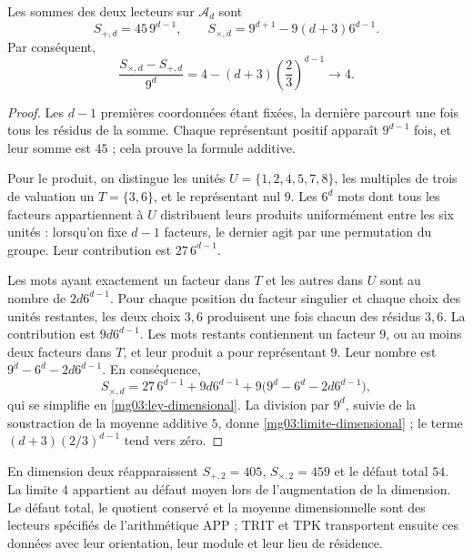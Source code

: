 \begin{proposition}
Les sommes des deux lecteurs sur \(\mathcal A_d\) sont
\begin{equation}
 S_{+,d}=45\,9^{d-1},\qquad
 S_{\times,d}=9^{d+1}-9(d+3)6^{d-1}.
 \label{mg03:ley-dimensional}
\end{equation}
Par conséquent,
\begin{equation}
 \frac{S_{\times,d}-S_{+,d}}{9^d}
 =4-(d+3)\left(\frac23\right)^{d-1}
 \longrightarrow4.
 \label{mg03:limite-dimensional}
\end{equation}
\end{proposition}

\begin{proof}
Les \(d-1\) premières coordonnées étant fixées, la dernière parcourt une fois
tous les résidus de la somme. Chaque représentant positif apparaît
\(9^{d-1}\) fois, et leur somme est \(45\) ; cela prouve la formule
additive.

Pour le produit, on distingue les unités
\(U=\{1,2,4,5,7,8\}\), les multiples de trois de valuation un
\(T=\{3,6\}\), et le représentant nul \(9\). Les \(6^d\)
mots dont tous les facteurs appartiennent à \(U\) distribuent leurs produits
uniformément entre les six unités : lorsqu'on fixe \(d-1\) facteurs,
le dernier agit par une permutation du groupe. Leur contribution est
\(27\,6^{d-1}\).

Les mots ayant exactement un facteur dans \(T\) et les autres dans \(U\) sont au nombre de \(2d6^{d-1}\). Pour chaque position du facteur singulier et chaque choix des unités restantes, les deux choix \(3,6\) produisent une fois chacun des résidus \(3,6\). La contribution est \(9d6^{d-1}\). Les mots restants contiennent un facteur \(9\), ou au moins deux facteurs dans \(T\), et leur produit a pour représentant \(9\). Leur nombre est \(9^d-6^d-2d6^{d-1}\). En conséquence,
\[
 S_{\times,d}=27\,6^{d-1}+9d6^{d-1}
 +9\bigl(9^d-6^d-2d6^{d-1}\bigr),
\]
qui se simplifie en \eqref{mg03:ley-dimensional}. La division par
\(9^d\), suivie de la soustraction de la moyenne additive \(5\), donne
\eqref{mg03:limite-dimensional} ; le terme
\((d+3)(2/3)^{d-1}\) tend vers zéro.
\end{proof}

En dimension deux réapparaissent \(S_{+,2}=405\),
\(S_{\times,2}=459\) et le défaut total \(54\). La limite
\(4\) appartient au défaut moyen lors de l'augmentation de la dimension. Le
défaut total, le quotient conservé et la moyenne dimensionnelle sont des
lecteurs spécifiés de l'arithmétique APP ; TRIT et TPK transportent
ensuite ces données avec leur orientation, leur module et leur lieu de résidence.

